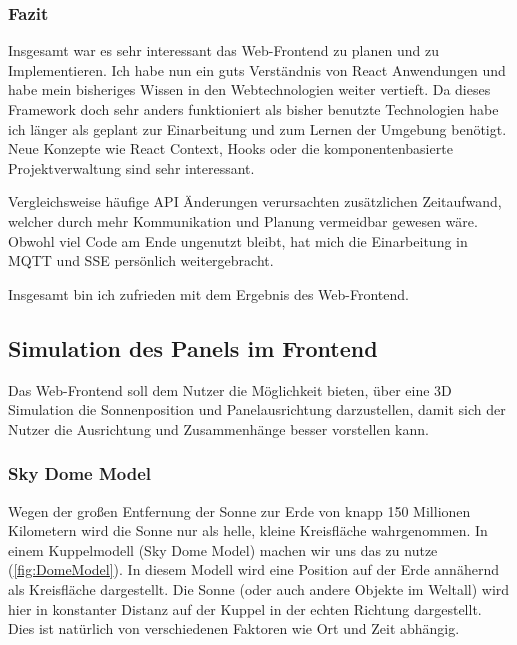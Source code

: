 \subsubsection{Fazit}
Insgesamt war es sehr interessant das Web-Frontend zu planen und zu Implementieren.
Ich habe nun ein guts Verständnis von React Anwendungen und habe mein bisheriges Wissen in den Webtechnologien weiter vertieft.
Da dieses Framework doch sehr anders funktioniert als bisher benutzte Technologien habe ich länger als geplant zur Einarbeitung und zum Lernen der Umgebung benötigt.
Neue Konzepte wie React Context, Hooks oder die komponentenbasierte Projektverwaltung sind sehr interessant.

Vergleichsweise häufige API Änderungen verursachten zusätzlichen Zeitaufwand, welcher durch mehr Kommunikation und Planung vermeidbar gewesen wäre.
Obwohl viel Code am Ende ungenutzt bleibt, hat mich die Einarbeitung in MQTT und SSE persönlich weitergebracht.

Insgesamt bin ich zufrieden mit dem Ergebnis des Web-Frontend.

\subsection{Simulation des Panels im Frontend}\label{websim}
Das Web-Frontend soll dem Nutzer die Möglichkeit bieten, über eine 3D Simulation die Sonnenposition und Panelausrichtung darzustellen, damit sich der Nutzer die Ausrichtung und Zusammenhänge besser vorstellen kann.

\subsubsection{Sky Dome Model}
Wegen der großen Entfernung der Sonne zur Erde von knapp 150 Millionen Kilometern wird die Sonne nur als helle, kleine Kreisfläche wahrgenommen.
In einem Kuppelmodell (Sky Dome Model) machen wir uns das zu nutze (\autoref{fig:DomeModel}).
In diesem Modell wird eine Position auf der Erde annähernd als Kreisfläche dargestellt. Die Sonne (oder auch andere Objekte im Weltall) wird hier in konstanter Distanz auf der Kuppel in der echten Richtung dargestellt. Dies ist natürlich von verschiedenen Faktoren wie Ort und Zeit abhängig.


